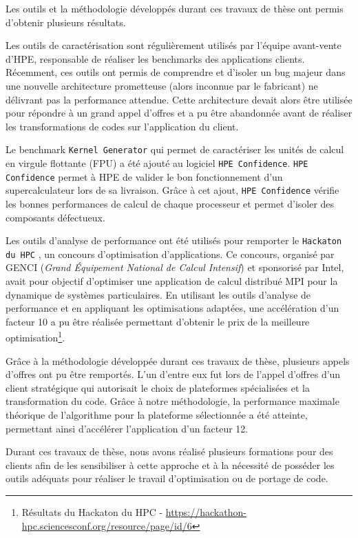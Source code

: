         Les outils et la méthodologie développés durant ces travaux de thèse ont permis d'obtenir plusieurs résultats.
        
        Les outils de caractérisation sont régulièrement utilisés par l'équipe avant-vente d'HPE, responsable de réaliser les \glspl{benchmark} des applications clients. Récemment, ces outils ont permis de comprendre et d’isoler un bug majeur dans une nouvelle architecture prometteuse (alors inconnue par le fabricant) ne délivrant pas la performance attendue. Cette architecture devait alors être utilisée pour répondre à un grand appel d'offres et a pu être abandonnée avant de réaliser les transformations de codes sur l'application du client.
        
        Le benchmark \verb|Kernel Generator| qui permet de caractériser les unités de calcul en virgule flottante (\gls{FPU}) a été ajouté au logiciel \verb|HPE Confidence|. \verb|HPE Confidence| permet à HPE de valider le bon fonctionnement d'un supercalculateur lors de sa livraison. Grâce à cet ajout, \verb|HPE Confidence| vérifie les bonnes performances de calcul de chaque processeur et permet d’isoler des composants défectueux. 

        Les outils d'analyse de performance ont été utilisés pour remporter le \verb|Hackaton du HPC| \cite{Hackaton}, un concours d’optimisation d’applications. Ce concours, organisé par GENCI (\textit{Grand Équipement National de Calcul Intensif}) et sponsorisé par Intel, avait pour objectif d’optimiser une application de calcul distribué MPI pour la dynamique de systèmes particulaires. En utilisant les outils d'analyse de performance et en appliquant les optimisations adaptées, une accélération d’un facteur 10 a pu être réalisée permettant d'obtenir le prix de la meilleure optimisation\footnote{Résultats du Hackaton du HPC - \url{https://hackathon-hpc.sciencesconf.org/resource/page/id/6}}.
        
        Grâce à la méthodologie développée durant ces travaux de thèse, plusieurs appels d'offres ont pu être remportés. L’un d’entre eux fut lors de l’appel d’offres d’un client stratégique qui autorisait le choix de plateformes spécialisées et la transformation du code. Grâce à notre méthodologie, la performance maximale théorique de l’algorithme pour la plateforme sélectionnée a été atteinte, permettant ainsi d'accélérer l'application d'un facteur 12. 
        
        Durant ces travaux de thèse, nous avons réalisé plusieurs formations pour des clients afin de les sensibiliser à cette approche et à la nécessité de posséder les outils adéquats pour réaliser le travail d’optimisation ou de portage de code.

